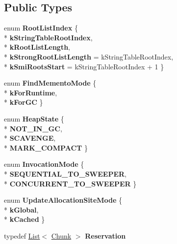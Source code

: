 \subsection*{Public Types}
\begin{DoxyCompactItemize}
\item 
enum {\bfseries Root\+List\+Index} \{ \\*
{\bfseries k\+String\+Table\+Root\+Index}, 
\\*
{\bfseries k\+Root\+List\+Length}, 
\\*
{\bfseries k\+Strong\+Root\+List\+Length} = k\+String\+Table\+Root\+Index, 
\\*
{\bfseries k\+Smi\+Roots\+Start} = k\+String\+Table\+Root\+Index + 1
 \}\hypertarget{classv8_1_1internal_1_1_heap_a1200483a0a6174ca571af94ba5ad1dce}{}\label{classv8_1_1internal_1_1_heap_a1200483a0a6174ca571af94ba5ad1dce}

\item 
enum {\bfseries Find\+Memento\+Mode} \{ \\*
{\bfseries k\+For\+Runtime}, 
\\*
{\bfseries k\+For\+GC}
 \}\hypertarget{classv8_1_1internal_1_1_heap_ad6c2e89bdc7ee6a4f99cda8b86de7c04}{}\label{classv8_1_1internal_1_1_heap_ad6c2e89bdc7ee6a4f99cda8b86de7c04}

\item 
enum {\bfseries Heap\+State} \{ \\*
{\bfseries N\+O\+T\+\_\+\+I\+N\+\_\+\+GC}, 
\\*
{\bfseries S\+C\+A\+V\+E\+N\+GE}, 
\\*
{\bfseries M\+A\+R\+K\+\_\+\+C\+O\+M\+P\+A\+CT}
 \}\hypertarget{classv8_1_1internal_1_1_heap_aee3f8b2c700602c6e8546212a2ac0f65}{}\label{classv8_1_1internal_1_1_heap_aee3f8b2c700602c6e8546212a2ac0f65}

\item 
enum {\bfseries Invocation\+Mode} \{ \\*
{\bfseries S\+E\+Q\+U\+E\+N\+T\+I\+A\+L\+\_\+\+T\+O\+\_\+\+S\+W\+E\+E\+P\+ER}, 
\\*
{\bfseries C\+O\+N\+C\+U\+R\+R\+E\+N\+T\+\_\+\+T\+O\+\_\+\+S\+W\+E\+E\+P\+ER}
 \}\hypertarget{classv8_1_1internal_1_1_heap_ad8d6fe025b4f9d95b533473ab78c79a8}{}\label{classv8_1_1internal_1_1_heap_ad8d6fe025b4f9d95b533473ab78c79a8}

\item 
enum {\bfseries Update\+Allocation\+Site\+Mode} \{ \\*
{\bfseries k\+Global}, 
\\*
{\bfseries k\+Cached}
 \}\hypertarget{classv8_1_1internal_1_1_heap_ade586167d5dbc159a771e701b0a84d67}{}\label{classv8_1_1internal_1_1_heap_ade586167d5dbc159a771e701b0a84d67}

\item 
typedef \hyperlink{classv8_1_1internal_1_1_list}{List}$<$ \hyperlink{structv8_1_1internal_1_1_heap_1_1_chunk}{Chunk} $>$ {\bfseries Reservation}\hypertarget{classv8_1_1internal_1_1_heap_a45c6a9fb8c48110c417d41bdde7c9bbc}{}\label{classv8_1_1internal_1_1_heap_a45c6a9fb8c48110c417d41bdde7c9bbc}

\end{DoxyCompactItemize}
